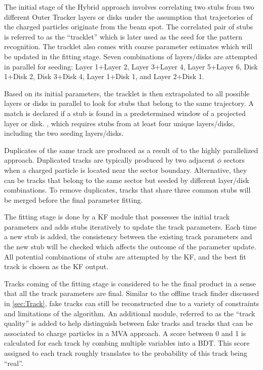 The initial stage of the Hybrid approach involves correlating two stubs from two different Outer Tracker layers or disks under the assumption that trajectories of the charged particles originate from the beam spot. The correlated pair of stubs is referred to as the ``tracklet'' which is later used as the seed for the pattern recognition. The tracklet also comes with coarse parameter estimates which will be updated in the fitting stage. Seven combinations of layers/disks are attempted in parallel for seeding: Layer 1+Layer 2, Layer 3+Layer 4, Layer 5+Layer 6, Disk 1+Disk 2, Disk 3+Disk 4, Layer 1+Disk 1, and Layer 2+Disk 1. 

Based on its initial parameters, the tracklet is then extrapolated to all possible layers or disks in parallel to look for stubs that belong to the same trajectory. A match is declared if a stub is found in a predetermined window of a projected layer or disk. , which requires stubs from at least four unique layers/disks, including the two seeding layers/disks.  

Duplicates of the same track are produced as a result of to the highly parallelized approach. Duplicated tracks are typically produced by two adjacent  $\phi$ sectors when a charged particle is located near the sector boundary. Alternative, they can be tracks that belong to the same sector but seeded by different layer/disk combinations. To remove duplicates, tracks that share three common stubs will be merged before the final parameter fitting. 

The fitting stage is done by a \ac{KF} module that possesses the initial track parameters and adds stubs iteratively to update the track parameters. Each time a new stub is added, the consistency between the existing track parameters and the new stub will be checked which affects the outcome of the parameter update. All potential combinations of stubs are attempted by the \ac{KF}, and the best fit track is chosen as the \ac{KF} output. 

Tracks coming of the fitting stage is considered to be the final product in a sense that all the track parameters are final.  Similar to the offline track finder discussed in \ref{sec:Track}, fake tracks can still be reconstructed due to a variety of constraints and limitations of the algorithm. An additional module, referred to as the ``track quality'' is added to help distinguish between fake tracks and tracks that can be associated to charge particles in a \ac{MVA} approach. A score between 0 and 1 is calculated for each track by combing multiple variables into a \ac{BDT}. This score assigned to each track roughly translates to the probability of this track being ``real''.

